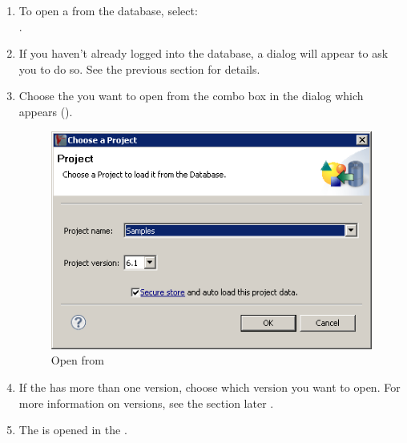 

\begin{enumerate}
\item To open a \gdproject{} from the database, select:\\
. 
\item If you haven't already logged into the database, a dialog will appear to ask you to do so.  See the previous section  for details. 
\item Choose the \gdproject{} you want to open from the combo box in the dialog which appears (). 

\begin{figure}
\includegraphics{Tasks/Projects/PS/loadfromdb}
\caption{Open \gdproject{} from \gddb{}}
\label{loadfromdb}
\end{figure}

\item If the \gdproject{} has more than one version, choose which version you want to open. For more information on \gdproject{} versions, see the section later . 
\item The \gdproject{} is opened in the \ite{}. 
\end{enumerate}

